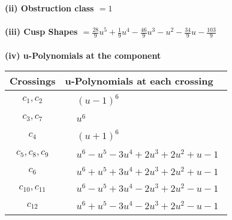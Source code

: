 \documentclass[1p]{elsarticle_modified}
\theoremstyle{definition}
\begin{document}
\flushleft \textbf{(ii) Obstruction class $= 1$}\\~\\
\flushleft \textbf{(iii) Cusp Shapes $= \frac{28}{9} u^5+\frac{1}{9} u^4-\frac{46}{9} u^3- u^2-\frac{34}{9} u-\frac{103}{9}$}\\~\\
\newpage\renewcommand{\arraystretch}{1}
\flushleft \textbf{(iv) u-Polynomials at the component}\newline \\
\begin{tabular}{m{50pt}|m{274pt}}
Crossings & \hspace{64pt}u-Polynomials at each crossing \\
\hline $$\begin{aligned}c_{1},c_{2}\end{aligned}$$&$\begin{aligned}
&(u-1)^6
\end{aligned}$\\
\hline $$\begin{aligned}c_{3},c_{7}\end{aligned}$$&$\begin{aligned}
&u^6
\end{aligned}$\\
\hline $$\begin{aligned}c_{4}\end{aligned}$$&$\begin{aligned}
&(u+1)^6
\end{aligned}$\\
\hline $$\begin{aligned}c_{5},c_{8},c_{9}\end{aligned}$$&$\begin{aligned}
&u^6- u^5-3 u^4+2 u^3+2 u^2+u-1
\end{aligned}$\\
\hline $$\begin{aligned}c_{6}\end{aligned}$$&$\begin{aligned}
&u^6+u^5+3 u^4+2 u^3+2 u^2+u-1
\end{aligned}$\\
\hline $$\begin{aligned}c_{10},c_{11}\end{aligned}$$&$\begin{aligned}
&u^6- u^5+3 u^4-2 u^3+2 u^2- u-1
\end{aligned}$\\
\hline $$\begin{aligned}c_{12}\end{aligned}$$&$\begin{aligned}
&u^6+u^5-3 u^4-2 u^3+2 u^2- u-1
\end{aligned}$\\
\hline
\end{tabular}\\~\\
\end{document}
